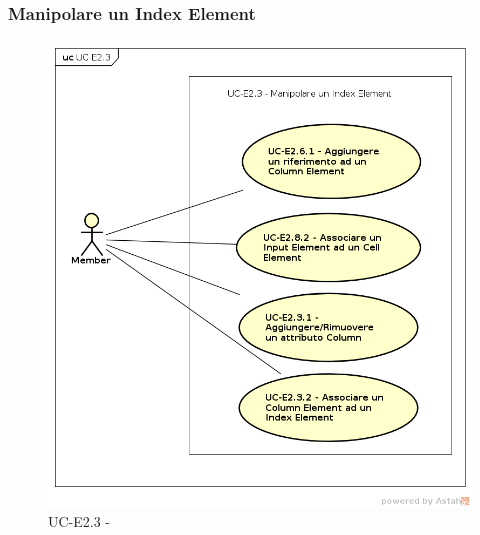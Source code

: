     
\subsubsection{Manipolare un Index Element}
    \begin{figure}[H]
      \begin{center}
        \includegraphics[width=12cm]{res/img/UCEditor/UC-E2.3.png}
      \caption{UC-E2.3 - }
      \end{center} 
    \end{figure}

